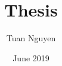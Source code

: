 \documentclass[11pt,a4paper]{article}
\begin{document}
\title{Thesis}
\author{Tuan Nguyen}
\date{June 2019}
\maketitle
\newpage

\tableofcontents
\newpage










\newpage


\end{document}
